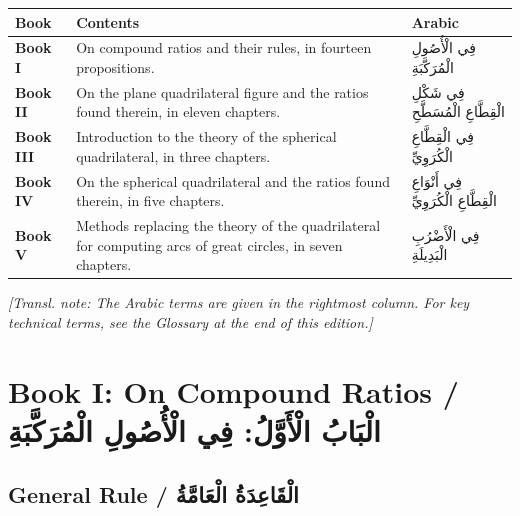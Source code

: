 \documentclass[11pt,a4paper]{article}
\theoremstyle{plain}
\theoremstyle{definition}
\theoremstyle{remark}
\newcommand{\ar}[1]{{\arabicfont\beginR #1\endR}}
\newcommand{\transnote}[1]{%
  \par\vspace{0.3em}%
  \noindent\textcolor{notecolor}{\textit{[Transl. note: #1]}}%
  \vspace{0.3em}%
}
\begin{document}
\begin{center}
\begin{longtable}{lp{8cm}l}
\toprule
\textbf{Book} & \textbf{Contents} & \textbf{Arabic} \\
\midrule
\endhead

\textbf{Book I} & On compound ratios and their rules, in fourteen propositions. & \ar{فِي الْأُصُولِ الْمُرَكَّبَةِ} \\
\addlinespace[0.2cm]

\textbf{Book II} & On the plane quadrilateral figure and the ratios found therein, in eleven chapters. & \ar{فِي شَكْلِ الْقِطَّاعِ الْمُسَطَّحِ} \\
\addlinespace[0.2cm]

\textbf{Book III} & Introduction to the theory of the spherical quadrilateral, in three chapters. & \ar{فِي الْقِطَّاعِ الْكُرَوِيِّ} \\
\addlinespace[0.2cm]

\textbf{Book IV} & On the spherical quadrilateral and the ratios found therein, in five chapters. & \ar{فِي أَنْوَاعِ الْقِطَّاعِ الْكُرَوِيِّ} \\
\addlinespace[0.2cm]

\textbf{Book V} & Methods replacing the theory of the quadrilateral for computing arcs of great circles, in seven chapters. & \ar{فِي الْأَضْرُبِ الْبَدِيلَةِ} \\
\bottomrule
\end{longtable}
\end{center}

\transnote{The Arabic terms are given in the rightmost column. For key
technical terms, see the Glossary at the end of this edition.}

\clearpage

\section{Book I: On Compound Ratios / \ar{الْبَابُ الْأَوَّلُ: فِي الْأُصُولِ الْمُرَكَّبَةِ}}
\label{sec:book1}

\subsection*{General Rule / \ar{الْقَاعِدَةُ الْعَامَّةُ}}
\end{document}
